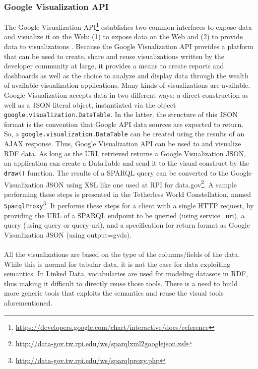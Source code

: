 \subsubsection{Google Visualization API}

The Google Visualization API\footnote{\url{https://developers.google.com/chart/interactive/docs/reference}} establishes two common interfaces to expose data and visualize it on the Web: (1) to expose data on the Web and (2) to provide data to visualizations \cite{rpi2012}.
Because the Google Visualization API provides a platform that can be used to create, share and reuse visualizations written by the developer community at large, it provides a means to create reports and dashboards as well as the choice to analyze and display data through the wealth of available visualization applications. Many kinds of visualizations are available. Google Visualization accepts data in two different ways: a direct construction as well as  a JSON literal object, instantiated via the object \texttt{google.visualization.DataTable}. In the latter, the structure of this JSON format is the convention that Google API data sources are expected to return. So, a \texttt{google.visualization.DataTable} can be created using the results of an AJAX response. Thus, Google Visualization API can be used to and visualize RDF data. As long as the URL retrieved returns a Google Visualization JSON, an application can create a DataTable and send it to the visual construct by the \texttt{draw()} function.  The results of a SPARQL query can be converted to the Google Visualization JSON using XSL like one used at RPI for data.gov\footnote{\url{http://data-gov.tw.rpi.edu/ws/sparqlxml2googlejson.xsl}}. A sample performing these steps is presented in the Tetherless World Constellation, named \texttt{SparqlProxy}\footnote{\url{http://data-gov.tw.rpi.edu/ws/sparqlproxy.php}}. It performs these steps for a client with a single HTTP request, by providing the URL of a SPARQL endpoint to be queried (using service\_uri), a query (using query or query-uri), and a specification for return format as Google Visualization JSON (using output=gvds).



\paragraph{}
All the visualizations are based on the type of the columns/fields of the data. While this is normal for tabular data, it is not the case for data exploiting semantics. In Linked Data, vocabularies are used for modeling datasets in RDF, thus making it difficult to directly reuse  those tools. There is a need to build more generic tools that exploits the semantics and reuse the visual tools aforementioned.


